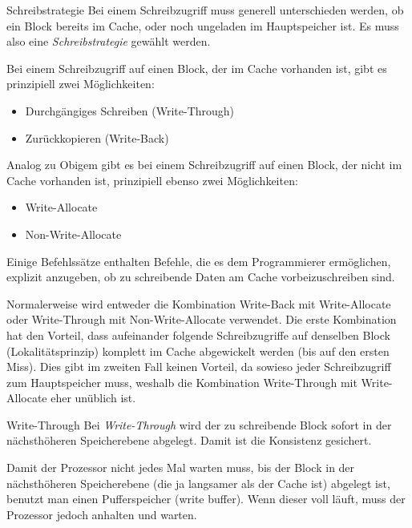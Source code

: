 \begin{defi}{Schreibstrategie}
    Bei einem Schreibzugriff muss generell unterschieden werden, ob ein Block bereits im Cache, oder noch ungeladen im Hauptspeicher ist.
    Es muss also eine \emph{Schreibstrategie} gewählt werden.
    
    Bei einem Schreibzugriff auf einen Block, der im Cache vorhanden ist, gibt es prinzipiell zwei Möglichkeiten:
    \begin{itemize}
        \item Durchgängiges Schreiben (Write-Through)
        \item Zurückkopieren (Write-Back)
    \end{itemize}
    
    Analog zu Obigem gibt es bei einem Schreibzugriff auf einen Block, der nicht im Cache vorhanden ist, prinzipiell ebenso zwei Möglichkeiten:
    \begin{itemize}
        \item Write-Allocate
        \item Non-Write-Allocate
    \end{itemize}
    
    Einige Befehlssätze enthalten Befehle, die es dem Programmierer ermöglichen, explizit anzugeben, ob zu schreibende Daten am Cache vorbeizuschreiben sind.
    
    Normalerweise wird entweder die Kombination Write-Back mit Write-Allocate oder Write-Through mit Non-Write-Allocate verwendet.
    Die erste Kombination hat den Vorteil, dass aufeinander folgende Schreibzugriffe auf denselben Block (Lokalitätsprinzip) komplett im Cache abgewickelt werden (bis auf den ersten Miss).
    Dies gibt im zweiten Fall keinen Vorteil, da sowieso jeder Schreibzugriff zum Hauptspeicher muss, weshalb die Kombination Write-Through mit Write-Allocate eher unüblich ist.
\end{defi}

\begin{defi}[Schreibstrategie]{Write-Through}
    Bei \emph{Write-Through} wird der zu schreibende Block sofort in der nächsthöheren Speicherebene abgelegt.
    Damit ist die Konsistenz gesichert.
    
    Damit der Prozessor nicht jedes Mal warten muss, bis der Block in der nächsthöheren Speicherebene (die ja langsamer als der Cache ist) abgelegt ist, benutzt man einen Pufferspeicher (write buffer).
    Wenn dieser voll läuft, muss der Prozessor jedoch anhalten und warten.
\end{defi}

